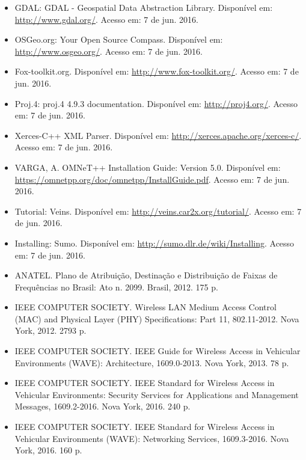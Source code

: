 \documentclass[
12pt,				%
openright,			%
oneside,			%
a4paper,			%
brazil,				%
]{abntex2}
\begin{document}
{\begin{itemize}[label={}]
		\item GDAL: GDAL - Geospatial Data Abstraction Library. Disponível em: \url{http://www.gdal.org/}. Acesso em: 7 de jun. 2016.
		
		\item OSGeo.org: Your Open Source Compass. Disponível em: \url{http://www.osgeo.org/}. Acesso em: 7 de jun. 2016.
		
		\item Fox-toolkit.org. Disponível em: \url{http://www.fox-toolkit.org/}. Acesso em: 7 de jun. 2016.
		
		\item Proj.4: proj.4 4.9.3 documentation. Disponível em: \url{http://proj4.org/}. Acesso em: 7 de jun. 2016.
		
		\item Xerces-C++ XML Parser. Disponível em: \url{http://xerces.apache.org/xerces-c/}. Acesso em: 7 de jun. 2016.
		
		\item VARGA, A. OMNeT++ Installation Guide: Version 5.0. Disponível em: \url{https://omnetpp.org/doc/omnetpp/InstallGuide.pdf}. Acesso em: 7 de jun. 2016.
		
		\item Tutorial: Veins. Disponível em: \url{http://veins.car2x.org/tutorial/}. Acesso em: 7 de jun. 2016.
		
		\item Installing: Sumo. Disponível em: \url{http://sumo.dlr.de/wiki/Installing}. Acesso em: 7 de jun. 2016.
		
		\item ANATEL. Plano de Atribuição, Destinação e Distribuição de Faixas de Frequências no Brasil: Ato n. 2099. Brasil, 2012. 175 p.
		
		\item IEEE COMPUTER SOCIETY. Wireless LAN Medium Access Control (MAC) and Physical Layer (PHY) Specifications: Part 11, 802.11-2012. Nova York, 2012. 2793 p.
		
		\item IEEE COMPUTER SOCIETY. IEEE Guide for Wireless Access in Vehicular Environments (WAVE): Architecture, 1609.0-2013. Nova York, 2013. 78 p.
		
		\item IEEE COMPUTER SOCIETY. IEEE Standard for Wireless Access in Vehicular Environments: Security Services for Applications and Management Messages, 1609.2-2016. Nova York, 2016. 240 p.
		
		\item IEEE COMPUTER SOCIETY. IEEE Standard for Wireless Access in Vehicular Environments (WAVE): Networking Services, 1609.3-2016. Nova York, 2016. 160 p.
		

\end{itemize}}
\end{document}
